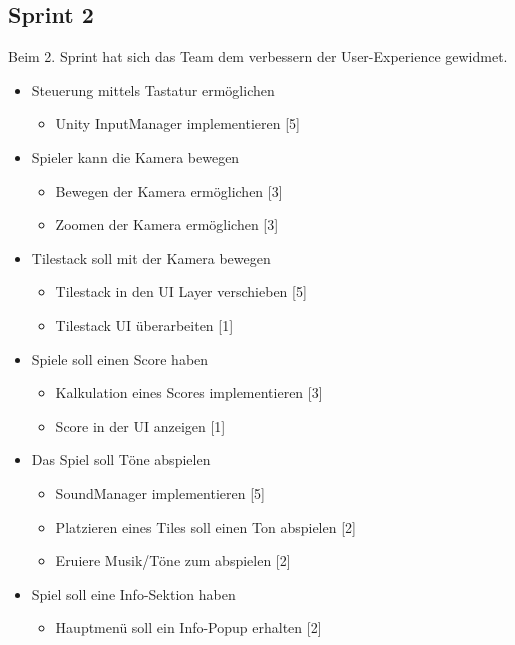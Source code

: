 \documentclass[../main.tex]{subfiles}
\begin{document}
	\newpage
	\subsection{Sprint 2}
	
	\par Beim 2. Sprint hat sich das Team dem verbessern der User-Experience gewidmet.
	
	\begin{itemize}
		\item Steuerung mittels Tastatur ermöglichen
		\begin{itemize}
			\item Unity InputManager implementieren [5]
		\end{itemize}
		\item Spieler kann die Kamera bewegen
		\begin{itemize}	
			\item Bewegen der Kamera ermöglichen [3]
			\item Zoomen der Kamera ermöglichen [3]
		\end{itemize}
		\item Tilestack soll mit der Kamera bewegen
		\begin{itemize}
			\item Tilestack in den UI Layer verschieben [5]
			\item Tilestack UI überarbeiten [1]
		\end{itemize}
		\item Spiele soll einen Score haben
		\begin{itemize}
			\item Kalkulation eines Scores implementieren [3]
			\item Score in der UI anzeigen [1]
		\end{itemize}
		\item Das Spiel soll Töne abspielen
		\begin{itemize}
			\item SoundManager implementieren [5]
			\item Platzieren eines Tiles soll einen Ton abspielen [2]
			\item Eruiere Musik/Töne zum abspielen [2]
		\end{itemize}
		\item Spiel soll eine Info-Sektion haben
		\begin{itemize}
			\item Hauptmenü soll ein Info-Popup erhalten [2]

\end{itemize}
\end{itemize}
\end{document}
